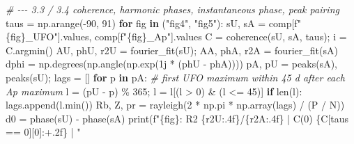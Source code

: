 \documentclass[
  10pt,
  a4paper,
]{article}
\newenvironment{Shaded}{}{}
\newcommand{\BuiltInTok}[1]{#1}
\newcommand{\CommentTok}[1]{\textit{#1}}
\newcommand{\ControlFlowTok}[1]{\textbf{#1}}
\newcommand{\DecValTok}[1]{#1}
\newcommand{\KeywordTok}[1]{\textbf{#1}}
\newcommand{\NormalTok}[1]{#1}
\newcommand{\OperatorTok}[1]{#1}
\newcommand{\OtherTok}[1]{#1}
\newcommand{\SpecialCharTok}[1]{#1}
\newcommand{\SpecialStringTok}[1]{#1}
\newcommand{\StringTok}[1]{#1}
\begin{document}
\begin{Shaded}
\begin{Highlighting}[]
\CommentTok{\# {-}{-}{-} 3.3 / 3.4  coherence, harmonic phases, instantaneous phase, peak pairing}
\NormalTok{taus }\OperatorTok{=}\NormalTok{ np.arange(}\OperatorTok{{-}}\DecValTok{90}\NormalTok{, }\DecValTok{91}\NormalTok{)}
\ControlFlowTok{for}\NormalTok{ fig }\KeywordTok{in}\NormalTok{ (}\StringTok{"fig4"}\NormalTok{, }\StringTok{"fig5"}\NormalTok{):}
\NormalTok{    sU, sA }\OperatorTok{=}\NormalTok{ comp[}\SpecialStringTok{f"}\SpecialCharTok{\{}\NormalTok{fig}\SpecialCharTok{\}}\SpecialStringTok{\_UFO"}\NormalTok{].values, comp[}\SpecialStringTok{f"}\SpecialCharTok{\{}\NormalTok{fig}\SpecialCharTok{\}}\SpecialStringTok{\_Ap"}\NormalTok{].values}
\NormalTok{    C }\OperatorTok{=}\NormalTok{ coherence(sU, sA, taus)}\OperatorTok{;}\NormalTok{ i }\OperatorTok{=}\NormalTok{ C.argmin()}
\NormalTok{    AU, phU, r2U }\OperatorTok{=}\NormalTok{ fourier\_fit(sU)}\OperatorTok{;}\NormalTok{ AA, phA, r2A }\OperatorTok{=}\NormalTok{ fourier\_fit(sA)}
\NormalTok{    dphi }\OperatorTok{=}\NormalTok{ np.degrees(np.angle(np.exp(}\OtherTok{1j} \OperatorTok{*}\NormalTok{ (phU }\OperatorTok{{-}}\NormalTok{ phA))))}
\NormalTok{    pA, pU }\OperatorTok{=}\NormalTok{ peaks(sA), peaks(sU)}\OperatorTok{;}\NormalTok{ lags }\OperatorTok{=}\NormalTok{ []}
    \ControlFlowTok{for}\NormalTok{ p }\KeywordTok{in}\NormalTok{ pA:                  }\CommentTok{\# first UFO maximum within 45 d after each Ap maximum}
\NormalTok{        l }\OperatorTok{=}\NormalTok{ (pU }\OperatorTok{{-}}\NormalTok{ p) }\OperatorTok{\%} \DecValTok{365}\OperatorTok{;}\NormalTok{ l }\OperatorTok{=}\NormalTok{ l[(l }\OperatorTok{\textgreater{}} \DecValTok{0}\NormalTok{) }\OperatorTok{\&}\NormalTok{ (l }\OperatorTok{\textless{}=} \DecValTok{45}\NormalTok{)]}
        \ControlFlowTok{if} \BuiltInTok{len}\NormalTok{(l): lags.append(l.}\BuiltInTok{min}\NormalTok{())}
\NormalTok{    Rb, Z, pr }\OperatorTok{=}\NormalTok{ rayleigh(}\DecValTok{2} \OperatorTok{*}\NormalTok{ np.pi }\OperatorTok{*}\NormalTok{ np.array(lags) }\OperatorTok{/}\NormalTok{ (P }\OperatorTok{/}\NormalTok{ N))}
\NormalTok{    d0 }\OperatorTok{=}\NormalTok{ phase(sU) }\OperatorTok{{-}}\NormalTok{ phase(sA)}
    \BuiltInTok{print}\NormalTok{(}\SpecialStringTok{f"}\SpecialCharTok{\{}\NormalTok{fig}\SpecialCharTok{\}}\SpecialStringTok{: R2 }\SpecialCharTok{\{}\NormalTok{r2U}\SpecialCharTok{:.4f\}}\SpecialStringTok{/}\SpecialCharTok{\{}\NormalTok{r2A}\SpecialCharTok{:.4f\}}\SpecialStringTok{ | C(0) }\SpecialCharTok{\{}\NormalTok{C[taus }\OperatorTok{==} \DecValTok{0}\NormalTok{][}\DecValTok{0}\NormalTok{]}\SpecialCharTok{:+.2f\}}\SpecialStringTok{ | "}

\end{Highlighting}
\end{Shaded}
\end{document}
